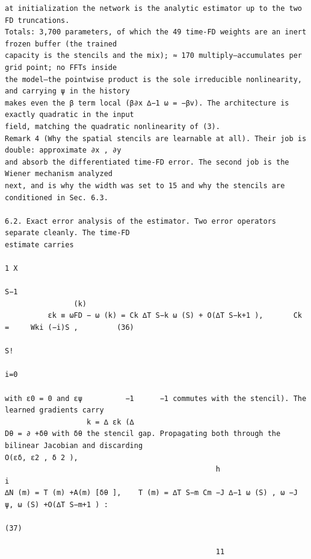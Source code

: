 \documentclass[letterpaper]{article}
\begin{document}
\begin{Verbatim}[fontsize=\fontsize{6.35}{7.15}\selectfont,breaklines=false]
    at initialization the network is the analytic estimator up to the two FD truncations.
Totals: 3,700 parameters, of which the 49 time-FD weights are an inert frozen buffer (the trained
capacity is the stencils and the mix); ≈ 170 multiply–accumulates per grid point; no FFTs inside
the model—the pointwise product is the sole irreducible nonlinearity, and carrying ψ in the history
makes even the β term local (β∂x ∆−1 ω = −βv). The architecture is exactly quadratic in the input
field, matching the quadratic nonlinearity of (3).
Remark 4 (Why the spatial stencils are learnable at all). Their job is double: approximate ∂x , ∂y
and absorb the differentiated time-FD error. The second job is the Wiener mechanism analyzed
next, and is why the width was set to 15 and why the stencils are conditioned in Sec. 6.3.

6.2. Exact error analysis of the estimator. Two error operators separate cleanly. The time-FD
estimate carries
                                                                        1 X
                                                                            S−1
                (k)
          εk ≡ ωFD − ω (k) = Ck ∆T S−k ω (S) + O(∆T S−k+1 ),       Ck =     Wki (−i)S ,         (36)
                                                                        S!
                                                                            i=0

with ε0 = 0 and εψ          −1      −1 commutes with the stencil). The learned gradients carry
                   k = ∆ εk (∆
Dθ = ∂ +δθ with δθ the stencil gap. Propagating both through the bilinear Jacobian and discarding
O(εδ, ε2 , δ 2 ),
                                                 h                           i
∆N (m) = T (m) +A(m) [δθ ],    T (m) = ∆T S−m Cm −J ∆−1 ω (S) , ω −J ψ, ω (S) +O(∆T S−m+1 ) :
                                                                                             (37)

                                                 11
\end{Verbatim}
\newpage
\end{document}
